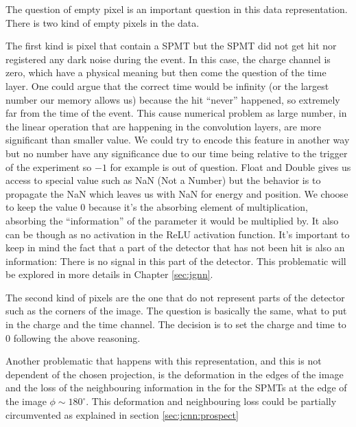 \documentclass[../main.tex]{subfiles}
\begin{document}
\hfill

The question of empty pixel is an important question in this data representation. There is two kind of empty pixels in the data.

The first kind is pixel that contain a SPMT but the SPMT did not get hit nor registered any dark noise during the event. In this case, the charge channel is zero, which have a physical meaning but then come the question of the time layer. One could argue that the correct time would be infinity (or the largest number our memory allows us) because the hit ``never'' happened, so extremely far from the time of the event. This cause numerical problem as large number, in the linear operation that are happening in the convolution layers, are more significant than smaller value. We could try to encode this feature in another way but no number have any significance due to our time being relative to the trigger of the experiment so $-1$ for example is out of question. Float and Double gives us access to special value such as NaN (Not a Number) \cite{noauthor_ieee_2019} but the behavior is to propagate the NaN which leaves us with NaN for energy and position. We choose to keep the value 0 because it's the absorbing element of multiplication, absorbing the ``information'' of the parameter it would be multiplied by. It also can be though as no activation in the ReLU activation function. It's important to keep in mind the fact that a part of the detector that has not been hit is also an information: There is no signal in this part of the detector. This problematic will be explored in more details in Chapter \ref{sec:jgnn}.

The second kind of pixels are the one that do not represent parts of the detector such as the corners of the image. The question is basically the same, what to put in the charge and the time channel. The decision is to set the charge and time to 0 following the above reasoning.

Another problematic that happens with this representation, and this is not dependent of the chosen projection, is the deformation in the edges of the image and the loss of the neighbouring information in the for the SPMTs at the edge of the image $\phi \sim 180^\circ$. This deformation and neighbouring loss could be partially circumvented as explained in section \ref{sec:jcnn:prospect}
\end{document}
